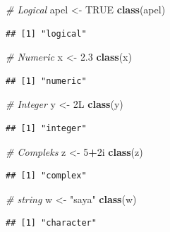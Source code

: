 \documentclass[12pt,]{krantz}
\newenvironment{Shaded}{\begin{snugshade}}{\end{snugshade}}
\newcommand{\CommentTok}[1]{\textcolor[rgb]{0.56,0.35,0.01}{\textit{#1}}}
\newcommand{\DecValTok}[1]{\textcolor[rgb]{0.00,0.00,0.81}{#1}}
\newcommand{\FloatTok}[1]{\textcolor[rgb]{0.00,0.00,0.81}{#1}}
\newcommand{\KeywordTok}[1]{\textcolor[rgb]{0.13,0.29,0.53}{\textbf{#1}}}
\newcommand{\NormalTok}[1]{#1}
\newcommand{\OperatorTok}[1]{\textcolor[rgb]{0.81,0.36,0.00}{\textbf{#1}}}
\newcommand{\OtherTok}[1]{\textcolor[rgb]{0.56,0.35,0.01}{#1}}
\newcommand{\StringTok}[1]{\textcolor[rgb]{0.31,0.60,0.02}{#1}}
\begin{document}
\begin{Shaded}
\begin{Highlighting}[]
\CommentTok{# Logical}
\NormalTok{apel <-}\StringTok{ }\OtherTok{TRUE}
\KeywordTok{class}\NormalTok{(apel)}
\end{Highlighting}
\end{Shaded}

\begin{verbatim}
## [1] "logical"
\end{verbatim}

\begin{Shaded}
\begin{Highlighting}[]
\CommentTok{# Numeric}
\NormalTok{x <-}\StringTok{ }\FloatTok{2.3}
\KeywordTok{class}\NormalTok{(x)}
\end{Highlighting}
\end{Shaded}

\begin{verbatim}
## [1] "numeric"
\end{verbatim}

\begin{Shaded}
\begin{Highlighting}[]
\CommentTok{# Integer}
\NormalTok{y <-}\StringTok{ }\NormalTok{2L}
\KeywordTok{class}\NormalTok{(y)}
\end{Highlighting}
\end{Shaded}

\begin{verbatim}
## [1] "integer"
\end{verbatim}

\begin{Shaded}
\begin{Highlighting}[]
\CommentTok{# Compleks}
\NormalTok{z <-}\StringTok{ }\DecValTok{5}\OperatorTok{+}\NormalTok{2i}
\KeywordTok{class}\NormalTok{(z)}
\end{Highlighting}
\end{Shaded}

\begin{verbatim}
## [1] "complex"
\end{verbatim}

\begin{Shaded}
\begin{Highlighting}[]
\CommentTok{# string}
\NormalTok{w <-}\StringTok{ "saya"}
\KeywordTok{class}\NormalTok{(w)}
\end{Highlighting}
\end{Shaded}

\begin{verbatim}
## [1] "character"
\end{verbatim}
\end{document}
